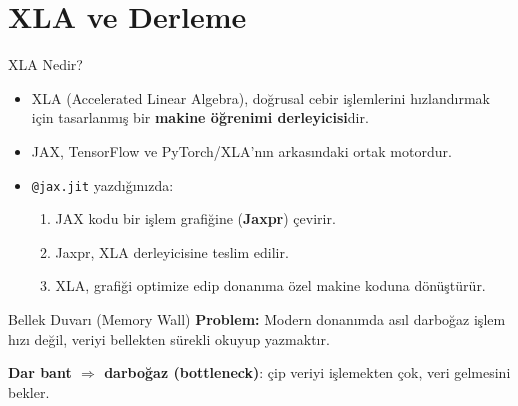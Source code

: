 \documentclass[aspectratio=169]{beamer}
\begin{document}
\section{XLA ve Derleme}

\begin{frame}{XLA Nedir?}
  \begin{itemize}
    \item XLA (Accelerated Linear Algebra), doğrusal cebir işlemlerini hızlandırmak için tasarlanmış bir \textbf{makine öğrenimi derleyicisi}dir.
    \item JAX, TensorFlow ve PyTorch/XLA'nın arkasındaki ortak motordur.
    \item \texttt{@jax.jit} yazdığınızda:
    \begin{enumerate}
      \item JAX kodu bir işlem grafiğine (\textbf{Jaxpr}) çevirir.
      \item Jaxpr, XLA derleyicisine teslim edilir.
      \item XLA, grafiği optimize edip donanıma özel makine koduna dönüştürür.
    \end{enumerate}
  \end{itemize}
\end{frame}

\begin{frame}{Bellek Duvarı (Memory Wall)}
  \textbf{Problem:} Modern donanımda asıl darboğaz işlem hızı değil, veriyi bellekten sürekli okuyup yazmaktır.

  \vspace{0.4cm}
  \begin{center}
  \end{center}

  \vspace{0.2cm}
  \centering \textbf{Dar bant $\Rightarrow$ darboğaz (bottleneck)}: çip veriyi işlemekten çok, veri gelmesini bekler.
\end{frame}
\end{document}

